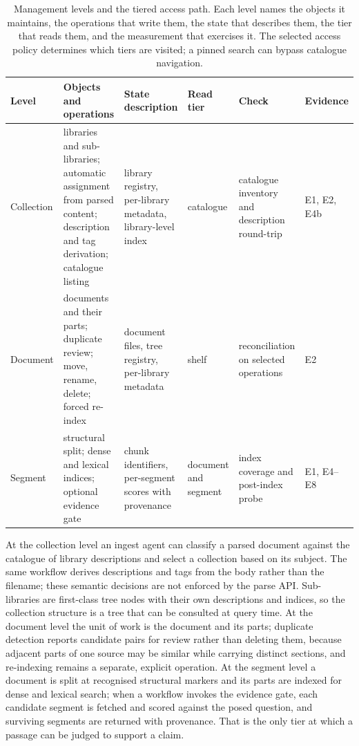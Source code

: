 \begin{table}[t]
\centering
\small
\setlength{\tabcolsep}{4pt}
\renewcommand{\arraystretch}{1.15}
\caption{Management levels and the tiered access path. Each level names the
objects it maintains, the operations that write them, the state that describes
them, the tier that reads them, and the measurement that exercises it.
The selected access policy determines which tiers are visited; a pinned
search can bypass catalogue navigation.}
\label{tab:levels}
\begin{tabular}{@{}>{\raggedright\arraybackslash}p{}>{\raggedright\arraybackslash}p{}>{\raggedright\arraybackslash}p{}>{\raggedright\arraybackslash}p{}>{\raggedright\arraybackslash}p{}>{\raggedright\arraybackslash}p{}@{}}
\toprule
Level & Objects and operations & State description & Read tier & Check & Evidence\\
\midrule
Collection & libraries and sub-libraries; automatic assignment from parsed content; description and tag derivation; catalogue listing & library registry, per-library metadata, library-level index & catalogue & catalogue inventory and description round-trip & E1, E2, E4b\\
Document & documents and their parts; duplicate review; move, rename, delete; forced re-index & document files, tree registry, per-library metadata & shelf & reconciliation on selected operations & E2\\
Segment & structural split; dense and lexical indices; optional evidence gate & chunk identifiers, per-segment scores with provenance & document and segment & index coverage and post-index probe & E1, E4--E8\\
\bottomrule
\end{tabular}
\end{table}

At the collection level an ingest agent can classify a parsed document against
the catalogue of library descriptions and select a collection based on its
subject. The same workflow derives descriptions and tags from the body rather
than the filename; these semantic decisions are not enforced by the parse API. Sub-libraries are
first-class tree nodes with their own descriptions and indices, so the
collection structure is a tree that can be consulted at query time. At the
document level the unit of work is the document and its parts; duplicate
detection reports candidate pairs for review rather than deleting them,
because adjacent parts of one source may be similar while carrying distinct
sections, and re-indexing remains a separate, explicit operation. At the
segment level a document is split at recognised structural markers and its
parts are indexed for dense and lexical search; when a workflow invokes the
evidence gate, each candidate segment is fetched and scored against the posed
question, and surviving segments are returned with provenance. That is the
only tier at which a passage can be judged to support a claim.

